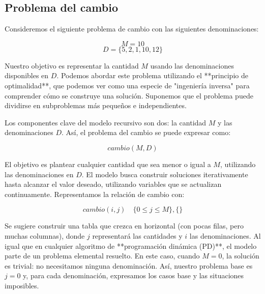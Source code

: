 \documentclass[tikz,11pt,fleqn]{book} %
\begin{document}


\subsection{Problema del cambio}

Consideremos el siguiente problema de cambio con las siguientes denominaciones:

$$
	M = 10
$$
$$
	D = \{5, 2, 1, 10, 12\}
$$

Nuestro objetivo es representar la cantidad $M$ usando las denominaciones disponibles en $D$. Podemos abordar este problema utilizando el **principio de optimalidad**, que podemos ver como una especie de "ingeniería inversa" para comprender cómo se construye una solución. Suponemos que el problema puede dividirse en subproblemas más pequeños e independientes.

Los componentes clave del modelo recursivo son dos: la cantidad $M$ y las denominaciones $D$. Así, el problema del cambio se puede expresar como:

$$
	cambio(M, D)
$$

El objetivo es plantear cualquier cantidad que sea menor o igual a $M$, utilizando las denominaciones en $D$. El modelo busca construir soluciones iterativamente hasta alcanzar el valor deseado, utilizando variables que se actualizan continuamente. Representamos la relación de cambio con:

$$
	cambio(i, j) \quad \{0 \leq j \leq M\}, \{\}
$$

Se sugiere construir una tabla que crezca en horizontal (con pocas filas, pero muchas columnas), donde $j$ representará las cantidades y $i$ las denominaciones. Al igual que en cualquier algoritmo de **programación dinámica (PD)**, el modelo parte de un problema elemental resuelto. En este caso, cuando $M=0$, la solución es trivial: no necesitamos ninguna denominación. Así, nuestro problema base es $j = 0$ y, para cada denominación, expresamos los casos base y las situaciones imposibles.
\end{document}
